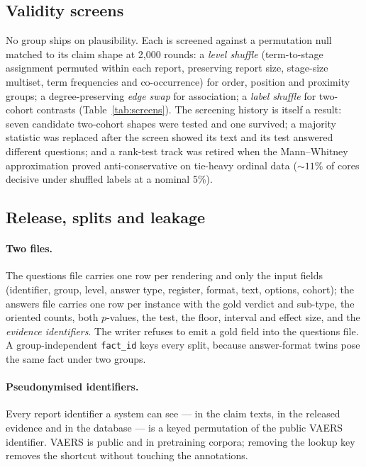 \subsection{Validity screens}
\label{sec:screens}

No group ships on plausibility. Each is screened against a permutation null
matched to its claim shape at 2{,}000 rounds: a \emph{level shuffle}
(term-to-stage assignment permuted within each report, preserving report size,
stage-size multiset, term frequencies and co-occurrence) for order, position
and proximity groups; a degree-preserving \emph{edge swap} for association; a
\emph{label shuffle} for two-cohort contrasts (Table~\ref{tab:screens}). The
screening history is itself a result: seven candidate two-cohort shapes were
tested and one survived; a majority statistic was replaced after the screen
showed its text and its test answered different questions; and a rank-test
track was retired when the Mann--Whitney approximation proved anti-conservative
on tie-heavy ordinal data (${\sim}11\%$ of cores decisive under shuffled labels
at a nominal 5\%).

\subsection{Release, splits and leakage}
\label{sec:release}

\paragraph{Two files.} The questions file carries one row per rendering and
only the input fields (identifier, group, level, answer type, register, format,
text, options, cohort); the answers file carries one row per instance with the
gold verdict and sub-type, the oriented counts, both $p$-values, the test, the
floor, interval and effect size, and the \emph{evidence identifiers}. The writer
refuses to emit a gold field into the questions file. A group-independent
\texttt{fact\_id} keys every split, because answer-format twins pose the same
fact under two groups.

\paragraph{Pseudonymised identifiers.} Every report identifier a system can
see --- in the claim texts, in the released evidence and in the database --- is
a keyed permutation of the public VAERS identifier. VAERS is public and in
pretraining corpora; removing the lookup key removes the shortcut without
touching the annotations.

